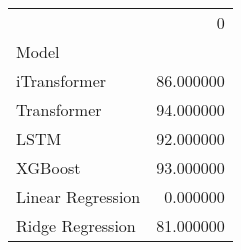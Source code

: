 \begin{tabular}{lr}
\toprule
 & 0 \\
Model &  \\
\midrule
iTransformer & 86.000000 \\
Transformer & 94.000000 \\
LSTM & 92.000000 \\
XGBoost & 93.000000 \\
Linear Regression & 0.000000 \\
Ridge Regression & 81.000000 \\
\bottomrule
\end{tabular}
